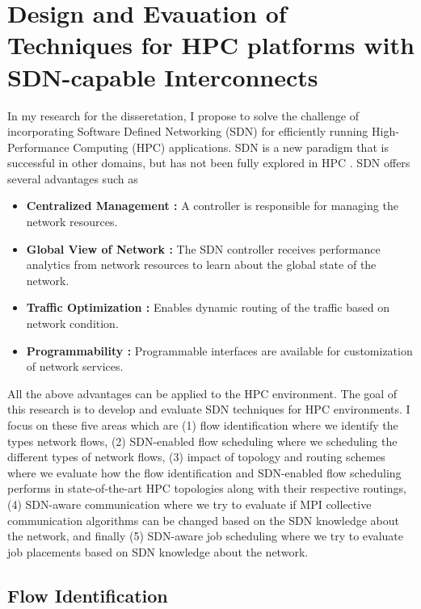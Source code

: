 \chapter{Design and Evauation of Techniques for HPC platforms with SDN-capable Interconnects} In
my research for the disseretation, I propose to solve the challenge of incorporating Software Defined
Networking (SDN) for efficiently running High-Performance Computing (HPC)
applications. SDN is a new paradigm that is successful in other domains, but has not
been fully explored in HPC \cite{kreutz2014software, alalmaei2020sdn, he2016firebird}. 
SDN offers several advantages such as
\begin{itemize}

\item \textbf{Centralized Management :} A controller is responsible for managing the network resources.
\item \textbf{Global View of Network :} The SDN controller receives performance analytics from network resources to learn about the global state of the network.
\item \textbf{Traffic Optimization :} Enables dynamic routing of the traffic based on network condition.
\item \textbf{Programmability :} Programmable interfaces are available for customization of network services.

\end{itemize}
All the above advantages can be applied to the HPC environment. 
The goal of this research is to develop and
evaluate SDN techniques for HPC environments. I focus on these five areas which are (1) flow identification where we identify the types network flows, (2) SDN-enabled flow scheduling where we scheduling the different types of network flows, (3) impact of topology and routing schemes where we evaluate how the flow identification and SDN-enabled flow scheduling performs in state-of-the-art HPC topologies along with their respective routings, (4) SDN-aware communication where we try to evaluate if MPI collective communication algorithms can be changed based on the SDN knowledge about the network, and finally (5) SDN-aware job scheduling where we try to evaluate job placements based on SDN knowledge about the network.




\section{Flow Identification}

